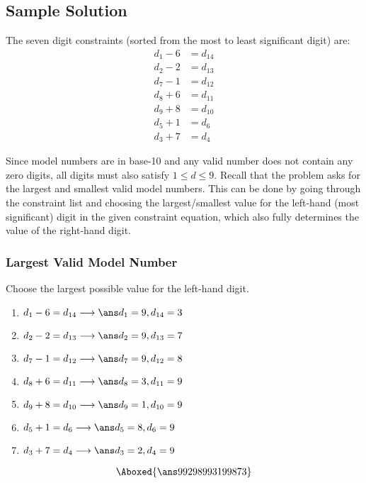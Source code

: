 \documentclass{article}
\begin{document}
\pagebreak
\subsection{Sample Solution}
The seven digit constraints (sorted from the most to least significant digit) are:
\begin{align}
d_1 - 6 &= d_{14} \\
d_2 - 2 &= d_{13} \\
d_7 - 1 &= d_{12} \\
d_8 + 6 &= d_{11} \\
d_9 + 8 &= d_{10} \\
d_5 + 1 &= d_6 \\
d_3 + 7 &= d_4
\end{align}

Since model numbers are in base-10 and any valid number does not contain any zero digits, all digits must also satisfy $1\leq d\leq9$. Recall that the problem asks for the largest and smallest valid model numbers. This can be done by going through the constraint list and choosing the largest/smallest value for the left-hand (most significant) digit in the given constraint equation, which also fully determines the value of the right-hand digit.

\subsubsection{Largest Valid Model Number}
Choose the largest possible value for the left-hand digit.
\begin{enumerate}
\item{$d_1-6=d_{14}\longrightarrow\ans d_1=9, d_{14}=3$}
\item{$d_2-2=d_{13}\longrightarrow\ans d_2=9, d_{13}=7$}
\item{$d_7-1=d_{12}\longrightarrow\ans d_7=9, d_{12}=8$}
\item{$d_8+6=d_{11}\longrightarrow\ans d_8=3, d_{11}=9$}
\item{$d_9+8=d_{10}\longrightarrow\ans d_9=1, d_{10}=9$}
\item{$d_5+1=d_6\longrightarrow\ans d_5=8, d_6=9$}
\item{$d_3+7=d_4\longrightarrow\ans d_3=2, d_4=9$}
\end{enumerate}
\begin{align*}
\Aboxed{\ans99298993199873}
\end{align*}
\end{document}
